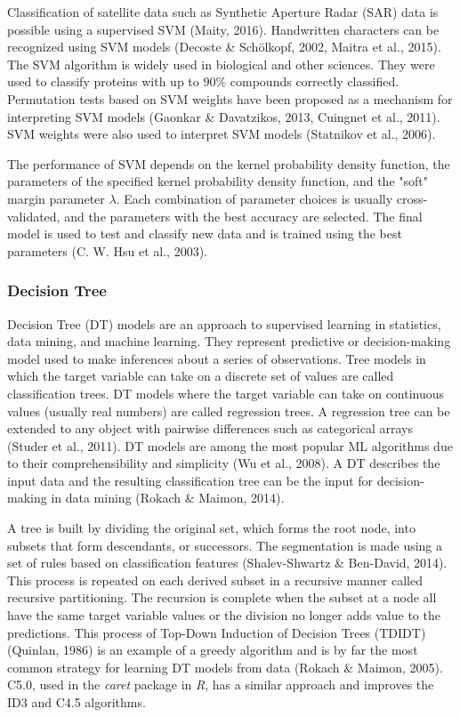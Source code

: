 \documentclass[sn-mathphys-num]{sn-jnl}%
\begin{document}
Classification of satellite data such as Synthetic Aperture Radar (SAR) data is possible using a supervised SVM (Maity, 2016). Handwritten characters can be recognized using SVM models (Decoste & Schölkopf, 2002, Maitra et al., 2015). The SVM algorithm is widely used in biological and other sciences. They were used to classify proteins with up to $90\%$ compounds correctly classified. Permutation tests based on SVM weights have been proposed as a mechanism for interpreting SVM models (Gaonkar & Davatzikos, 2013, Cuingnet et al., 2011). SVM weights were also used to interpret SVM models (Statnikov et al., 2006).

The performance of SVM depends on the kernel probability density function, the parameters of the specified kernel probability density function, and the "soft" margin parameter $\lambda$. Each combination of parameter choices is usually cross-validated, and the parameters with the best accuracy are selected. The final model is used to test and classify new data and is trained using the best parameters (C. W. Hsu et al., 2003).

\subsubsection{Decision Tree}

Decision Tree (DT) models are an approach to supervised learning in statistics, data mining, and machine learning. They represent predictive or decision-making model used to make inferences about a series of observations. Tree models in which the target variable can take on a discrete set of values are called classification trees. DT models where the target variable can take on continuous values (usually real numbers) are called regression trees. A regression tree can be extended to any object with pairwise differences such as categorical arrays (Studer et al., 2011). DT models are among the most popular ML algorithms due to their comprehensibility and simplicity (Wu et al., 2008). A DT describes the input data and the resulting classification tree can be the input for decision-making in data mining (Rokach & Maimon, 2014).

A tree is built by dividing the original set, which forms the root node, into subsets that form descendants, or successors. The segmentation is made using a set of rules based on classification features (Shalev-Shwartz & Ben-David, 2014). This process is repeated on each derived subset in a recursive manner called recursive partitioning. The recursion is complete when the subset at a node all have the same target variable values or the division no longer adds value to the predictions. This process of Top-Down Induction of Decision Trees (TDIDT) (Quinlan, 1986) is an example of a greedy algorithm and is by far the most common strategy for learning DT models from data (Rokach & Maimon, 2005). C5.0, used in the \textit{caret} package in \textit{R}, has a similar approach and improves the ID3 and C4.5 algorithms.
\end{document}
